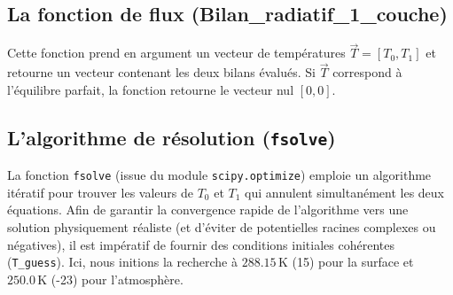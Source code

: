 \documentclass[11pt,a4paper]{article}
\begin{document}
\subsection{La fonction de flux (Bilan\_radiatif\_1\_couche)}
Cette fonction prend en argument un vecteur de températures $\vec{T} = [T_0, T_1]$ et retourne un vecteur contenant les deux bilans évalués. Si $\vec{T}$ correspond à l'équilibre parfait, la fonction retourne le vecteur nul $[0, 0]$.

\subsection{L'algorithme de résolution (\texttt{fsolve})}
La fonction \texttt{fsolve} (issue du module \texttt{scipy.optimize}) emploie un algorithme itératif pour trouver les valeurs de $T_0$ et $T_1$ qui annulent simultanément les deux équations. 
Afin de garantir la convergence rapide de l'algorithme vers une solution physiquement réaliste (et d'éviter de potentielles racines complexes ou négatives), il est impératif de fournir des conditions initiales cohérentes (\texttt{T\_guess}). Ici, nous initions la recherche à $288.15 \, \text{K}$ (15) pour la surface et $250.0 \, \text{K}$ (-23) pour l'atmosphère. 
\end{document}
